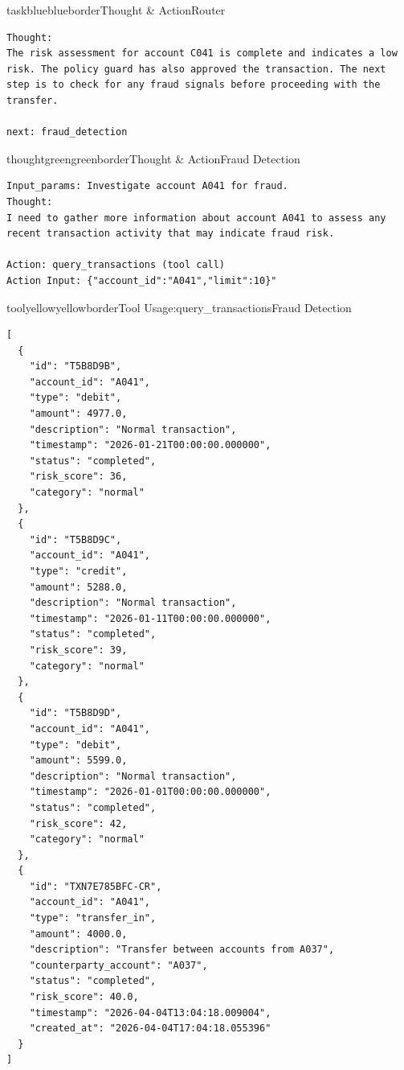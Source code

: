 \begin{agentbox}{taskblue}{blueborder}{Thought \& Action}{Router}
\begin{lstlisting}[style=myprompt]
Thought:
The risk assessment for account C041 is complete and indicates a low risk. The policy guard has also approved the transaction. The next step is to check for any fraud signals before proceeding with the transfer.

next: fraud_detection
\end{lstlisting}
\end{agentbox}

\begin{agentbox}{thoughtgreen}{greenborder}{Thought \& Action}{Fraud Detection}
\begin{lstlisting}[style=myprompt]
Input_params: Investigate account A041 for fraud.
Thought: 
I need to gather more information about account A041 to assess any recent transaction activity that may indicate fraud risk. 

Action: query_transactions (tool call)
Action Input: {"account_id":"A041","limit":10}"

\end{lstlisting}
\end{agentbox}

\begin{agentbox}{toolyellow}{yellowborder}{Tool Usage:query\_transactions}{Fraud Detection}
\begin{lstlisting}[style=myprompt]
[
  {
    "id": "T5B8D9B",
    "account_id": "A041",
    "type": "debit",
    "amount": 4977.0,
    "description": "Normal transaction",
    "timestamp": "2026-01-21T00:00:00.000000",
    "status": "completed",
    "risk_score": 36,
    "category": "normal"
  },
  {
    "id": "T5B8D9C",
    "account_id": "A041",
    "type": "credit",
    "amount": 5288.0,
    "description": "Normal transaction",
    "timestamp": "2026-01-11T00:00:00.000000",
    "status": "completed",
    "risk_score": 39,
    "category": "normal"
  },
  {
    "id": "T5B8D9D",
    "account_id": "A041",
    "type": "debit",
    "amount": 5599.0,
    "description": "Normal transaction",
    "timestamp": "2026-01-01T00:00:00.000000",
    "status": "completed",
    "risk_score": 42,
    "category": "normal"
  },
  {
    "id": "TXN7E785BFC-CR",
    "account_id": "A041",
    "type": "transfer_in",
    "amount": 4000.0,
    "description": "Transfer between accounts from A037",
    "counterparty_account": "A037",
    "status": "completed",
    "risk_score": 40.0,
    "timestamp": "2026-04-04T13:04:18.009004",
    "created_at": "2026-04-04T17:04:18.055396"
  }
]
\end{lstlisting}
\end{agentbox}

